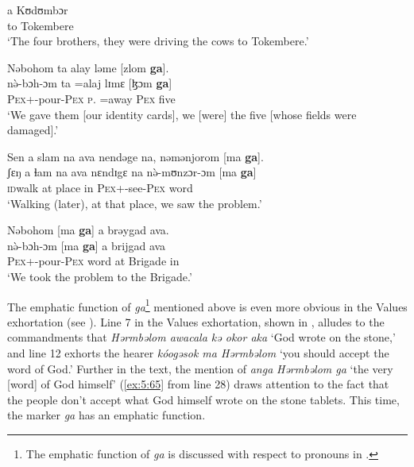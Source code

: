       \medskip
\gll a     Kʊdʊmbɔr\\
     to    Tokembere\\
\glt  ‘The four brothers, they were driving the cows to Tokembere.’ 
\z

\ea \label{ex:5:60}
Nəbohom  ta  alay  ləme  [zlom  \textbf{ga}].\\
\gll  n\`{ə}-bɔh-ɔm      ta    =alaj  lɪmɛ  [ɮɔm   \textbf{ga}]\\
      \textsc{Pex}+{\PFV}-pour-\textsc{Pex}  \textsc{p}.{\DO} =away  \textsc{Pex}   five  {\ADJ}\\
\glt  ‘We gave them [our identity cards], we [were] the five [whose fields were damaged].’ 
\z

\ea \label{ex:5:61}
Sen  a slam  na  ava  nendəge  na,  nəmənjorom  [ma  \textbf{ga}].\\
\gll  ʃɛŋ     a   ɬam   na  ava   nɛndɪgɛ  na  n\`{ə}-mʊnzɔr-ɔm    [ma     \textbf{ga}]\\
 \textsc{id}walk  at  place   {\PSP}  in   {\DEM}   {\PSP}   \textsc{Pex}+{\PFV}-see-\textsc{Pex}   word   {\ADJ}\\
\glt ‘Walking (later), at that place, we saw the problem.’
\z

\ea \label{ex:5:62}
Nəbohom  [ma  \textbf{ga}]  a  brəygad  ava.\\
\gll  n\`{ə}-bɔh-ɔm      [ma  \textbf{ga}]  a  brijgad  ava\\
      \textsc{Pex}+{\PFV}-pour-\textsc{Pex}    word  {\ADJ}   at   Brigade  in\\
\glt  ‘We took the problem to the Brigade.’
\z

The emphatic function of \textit{ga}\footnote{The emphatic function of \textit{ga} is discussed with respect to pronouns in .} mentioned above is even more obvious in the Values exhortation (see ). Line 7 in the Values exhortation, shown in , alludes to the commandments that \textit{Hərmbəlom  awacala  kə  okor  aka} ‘God wrote on the stone,’ and line 12  exhorts the hearer \textit{kóogəsok ma  Hərmbəlom} ‘you should accept the word of God.’ Further in the text, the mention of \textit{anga} \textit{Hərmbəlom ga } ‘the very [word] of God himself’ (\ref{ex:5:65} from line 28) draws attention to the fact that the people don’t accept what God himself wrote on the stone tablets. This time, the marker \textit{ga}  has an emphatic function. 


